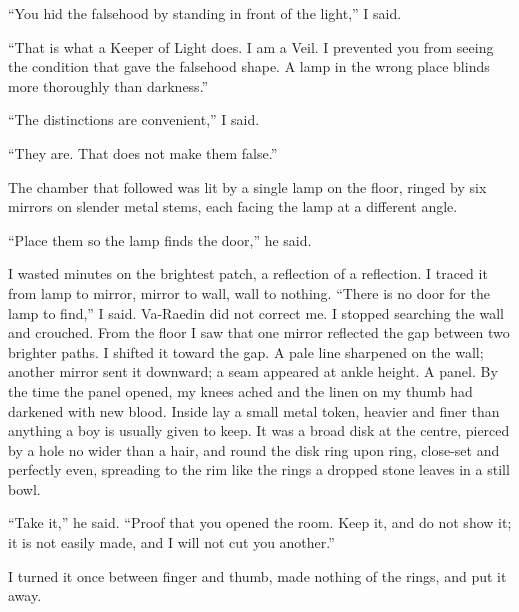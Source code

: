 ``You hid the falsehood by standing in front of the light,'' I said.\par
``That is what a Keeper of Light does. I am a Veil. I prevented you from seeing the condition that gave the falsehood shape. A lamp in the wrong place blinds more thoroughly than darkness.''\par

``The distinctions are convenient,'' I said.\par

``They are. That does not make them false.''\par

\ornament

The chamber that followed was lit by a single lamp on the floor, ringed by six mirrors on slender metal stems, each facing the lamp at a different angle. 

``Place them so the lamp finds the door,'' he said. \par

I wasted minutes on the brightest patch, a reflection of a reflection. I traced it from lamp to mirror, mirror to wall, wall to nothing. ``There is no door for the lamp to find,'' I said. Va-Raedin did not correct me. I stopped searching the wall and crouched. From the floor I saw that one mirror reflected the gap between two brighter paths. I shifted it toward the gap. A pale line sharpened on the wall; another mirror sent it downward; a seam appeared at ankle height. A panel. By the time the panel opened, my knees ached and the linen on my thumb had darkened with new blood. Inside lay a small metal token, heavier and finer than anything a boy is usually given to keep. It was a broad disk at the centre, pierced by a hole no wider than a hair, and round the disk ring upon ring, close-set and perfectly even, spreading to the rim like the rings a dropped stone leaves in a still bowl.\par

``Take it,'' he said. ``Proof that you opened the room. Keep it, and do not show it; it is not easily made, and I will not cut you another.''\par

I turned it once between finger and thumb, made nothing of the rings, and put it away.\par

